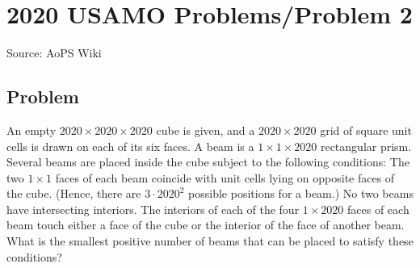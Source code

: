\documentclass[12pt]{article}
\begin{document}
\section*{{2020 USAMO Problems/Problem 2}}
Source: AoPS Wiki

\subsection*{Problem}
An empty $2020 \times 2020 \times 2020$ cube is given, and a $2020 \times 2020$ grid of square unit cells is drawn on each of its six faces. A beam is a $1 \times 1 \times 2020$ rectangular prism. Several beams are placed inside the cube subject to the following conditions: The two $1 \times 1$ faces of each beam coincide with unit cells lying on opposite faces of the cube. (Hence, there are $3 \cdot 2020^2$ possible positions for a beam.) No two beams have intersecting interiors. The interiors of each of the four $1 \times 2020$ faces of each beam touch either a face of the cube or the interior of the face of another beam. What is the smallest positive number of beams that can be placed to satisfy these conditions?
\end{document}
